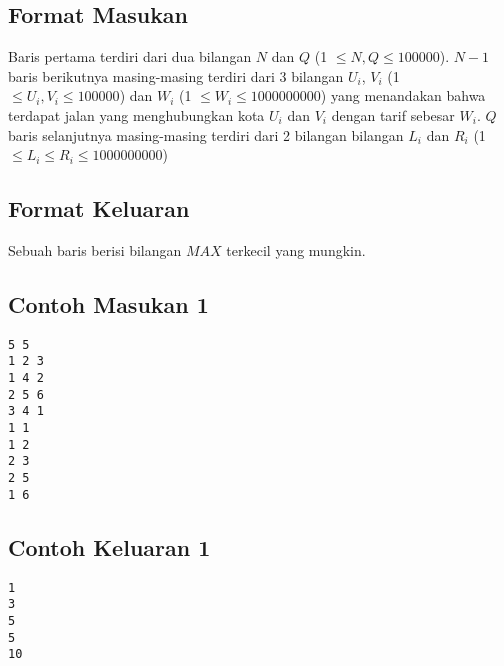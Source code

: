 \documentclass{article}
\begin{document}


\subsection*{Format Masukan}


Baris pertama terdiri dari dua bilangan $N$ dan $Q$ (1 $\leq N, Q \leq 100000$).
${N-1}$ baris berikutnya masing-masing terdiri dari 3 bilangan $U_i$, $V_i$ (1 $\leq U_i, V_i \leq 100000$) dan $W_i$ (1 $\leq W_i \leq 1000000000$) yang menandakan bahwa terdapat jalan yang 
menghubungkan kota $U_i$ dan $V_i$ dengan tarif sebesar $W_i$.
$Q$ baris selanjutnya masing-masing terdiri dari 2 bilangan bilangan $L_i$ dan $R_i$ (1 $\leq L_i \leq R_i \leq 1000000000$)

\subsection*{Format Keluaran}
Sebuah baris berisi bilangan $MAX$ terkecil yang mungkin.
\begin{multicols}{2}
\subsection*{Contoh Masukan 1}
\begin{lstlisting}
5 5
1 2 3
1 4 2
2 5 6
3 4 1
1 1
1 2
2 3
2 5
1 6
\end{lstlisting}
\vfill
\null
\columnbreak
\subsection*{Contoh Keluaran 1}
\begin{lstlisting}
1
3
5
5
10
\end{lstlisting}
\end{multicols}



\pagebreak
\end{document}
